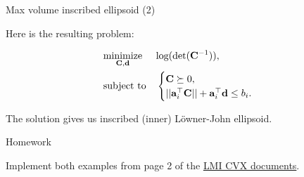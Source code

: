\documentclass{beamer}
\begin{document}
\begin{frame}{Max volume inscribed ellipsoid (2)}
	\begin{flushleft}
		
		Here is the resulting problem:
		
		\begin{equation}
			\begin{aligned}
				& \underset{\mathbf{C}, \mathbf{d}}{\text{minimize}}
				& & \text{log} (\text{det} (\mathbf{C}^{-1}) ), \\
				& \text{subject to}
				& & \begin{cases}
					\mathbf{C} \succeq 0, \\
					|| \mathbf{a}_i^\top \mathbf{C} || + \mathbf{a}_i^\top\mathbf{d} \leq b_i.
				\end{cases}
			\end{aligned}
		\end{equation}
		
		The solution gives us inscribed (inner) L\"owner-John ellipsoid.
		
	\end{flushleft}
\end{frame}




%
%
%
%



\begin{frame}{Homework}
\begin{flushleft}


Implement both examples from page 2 of the \href{http://stanford.edu/class/ee363/notes/lmi-cvx.pdf}{LMI CVX documents}.

\end{flushleft}
\end{frame}






\myqrframe
\end{document}
